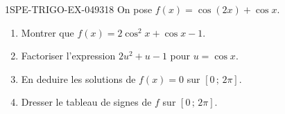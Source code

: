 \begin{exercice}{1SPE-TRIGO-EX-049}{3}{18}
On pose $f(x) = \cos(2x) + \cos x$.
\begin{enumerate}
  \item Montrer que $f(x) = 2\cos^2 x + \cos x - 1$.
  \item Factoriser l'expression $2u^2 + u - 1$ pour $u = \cos x$.
  \item En deduire les solutions de $f(x) = 0$ sur $[0\,;\,2\pi]$.
  \item Dresser le tableau de signes de $f$ sur $[0\,;\,2\pi]$.
\end{enumerate}
\end{exercice}
